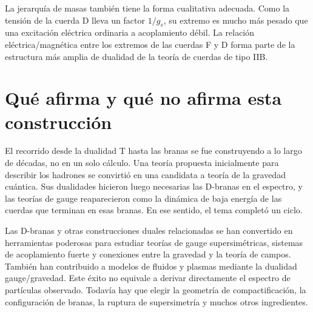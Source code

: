 La jerarquía de masas también tiene la forma cualitativa adecuada. Como la tensión de la cuerda D lleva un factor \(1/g_s\), su extremo es mucho más pesado que una excitación eléctrica ordinaria a acoplamiento débil. La relación eléctrica/magnética entre los extremos de las cuerdas F y D forma parte de la estructura más amplia de dualidad de la teoría de cuerdas de tipo IIB.

\begin{classroomqa}
\end{classroomqa}

\section{Qué afirma y qué no afirma esta construcción}

El recorrido desde la dualidad T hasta las branas se fue construyendo a lo largo de décadas, no en un solo cálculo. Una teoría propuesta inicialmente para describir los hadrones se convirtió en una candidata a teoría de la gravedad cuántica. Sus dualidades hicieron luego necesarias las D-branas en el espectro, y las teorías de gauge reaparecieron como la dinámica de baja energía de las cuerdas que terminan en esas branas. En ese sentido, el tema completó un ciclo.

Las D-branas y otras construcciones duales relacionadas se han convertido en herramientas poderosas para estudiar teorías de gauge supersimétricas, sistemas de acoplamiento fuerte y conexiones entre la gravedad y la teoría de campos. También han contribuido a modelos de fluidos y plasmas mediante la dualidad gauge/gravedad. Este éxito no equivale a derivar directamente el espectro de partículas observado. Todavía hay que elegir la geometría de compactificación, la configuración de branas, la ruptura de supersimetría y muchos otros ingredientes.

\begin{classroomqa}
\end{classroomqa}

